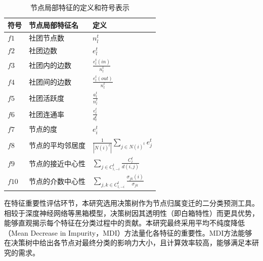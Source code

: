 \begin{table}[!htbp]
	
	\centering
	\caption{节点局部特征的定义和符号表示}\label{tab.3.1}
	\vspace{0.5em}\centering\wuhao
	\begin{tabular}{lll}
			\hline
			符号&节点局部特征名 & 定义\\
			\hline
			$f1$&社团节点数  & $n_l^t$\\
			$f2$&社团边数 & $e_l^t$\\
			$f3$&社团内的边数 & $\frac{e_l^t(in)}{n_l^t}$\\
			$f4$&社团间的边数&  $\frac{e_l^t(out)}{n_l^t}$\\
			$f5$&社团活跃度 & $\frac{a_l^t}{n_l^t}$\\
			$f6$&社团连通率 &  $\frac{e_l^t}{d_l^t}$\\
			$f7$&节点的度 & $e_i^t$ \\
			$f8$&节点的平均邻居度 &  $\frac{1}{|N(i)^t|}\sum_{j\in N(i)^t}e_j^t$ \\
			$f9$&节点的接近中心性 &  $\sum_{j\in C_{l,-i}^t}\frac{C_l^t}{d(i,j)}$ \\
			$f10$&节点的介数中心性 &  $\sum_{j,k \in C_{l,-i}^t}\frac{\sigma_{jk}(i)}{\sigma_{jk}}$\\
			\hline
		\end{tabular}
		
	\end{table}


在特征重要性评估环节，本研究选用决策树作为节点归属变迁的二分类预测工具。相较于深度神经网络等黑箱模型，决策树因其透明性（即白箱特性）而更具优势，能够直观揭示每个特征在分类过程中的贡献。本研究最终采用平均不纯度降低（Mean Decrease in Impurity，MDI）方法\cite{menze2009comparison}量化各特征的重要性。MDI方法能够在决策树中给出各节点对最终分类的影响力大小，且计算效率较高，能够满足本研究的需求。











